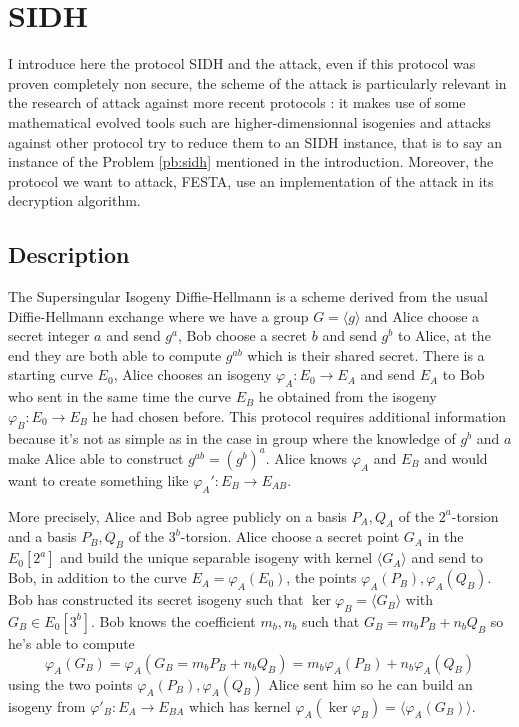 \documentclass[12pt,a4paper]{article}
\begin{document}
		\section{SIDH}


		I introduce here the protocol SIDH and the attack, even if this protocol was proven completely non
		secure, the scheme of the attack is particularly relevant in the research of attack against more
		recent protocols : it makes use of some mathematical evolved tools such are higher-dimensionnal
		isogenies and attacks against other protocol try to reduce them to an SIDH instance, that is to say 
		an instance of the Problem \ref{pb:sidh} mentioned in the introduction.
		Moreover, the protocol we want to attack, FESTA, use an implementation of the attack in its
		decryption algorithm.  

		\subsection{Description}
	The Supersingular Isogeny Diffie-Hellmann is a scheme derived from the usual
	Diffie-Hellmann exchange where we have a group $G= \langle g\rangle$ and Alice choose a
	secret integer $a$ and send $g^a$, Bob choose a secret $b$ and send $g^b$ to Alice,
	at the end they are both able to compute $g^{ab}$ which is their shared secret.
	There is a starting curve $E_0$, Alice chooses an isogeny $\varphi_A:E_0\to E_A$
	and send $E_A$ to Bob who sent in the same time the curve $E_B$ he obtained
	from the isogeny $\varphi_B:E_0\to E_B$ he had chosen before.
	This protocol requires additional information because it's not as simple as in the
	case in group where the knowledge of $g^b$ and $a$ make Alice able to construct
	$g^{ab}=(g^b)^a$.
	Alice knows $\varphi_A$ and  $E_B$ and would want to create something like
	$\varphi_A':E_B\to E_{AB}$.

	More precisely, Alice and Bob agree publicly on a basis $P_A,Q_A$ of the  $2^{a}$-torsion
	and a basis $P_B,Q_B$ of the $3^{b}$-torsion. Alice choose a secret point $G_A$ in the $E_0[2^{a}]$
	and build the unique separable isogeny with kernel $\langle G_A \rangle$ and send to Bob, in
	addition to the curve $E_A=\varphi_A(E_0)$, the points $\varphi_A(P_B),\varphi_A(Q_B)$.
	Bob has constructed its secret isogeny such that $\ker\varphi_B=\langle G_B\rangle$ with
	$G_B\in E_0[3^b]$. Bob knows the coefficient $m_b,n_b$ such that $G_B=m_bP_B+n_bQ_B$ so he's
	able to compute  $$\varphi_A(G_B)=\varphi_A(G_B=m_bP_B+n_bQ_B)=m_b\varphi_A(P_B)+n_b\varphi_A(Q_B)$$
	using the two points $\varphi_A(P_B),\varphi_A(Q_B)$ Alice sent him so he can build an isogeny
	from $\varphi'_B:E_A\to E_{BA}$ which has kernel $\varphi_A(\ker\varphi_B) = \langle
	\varphi_A(G_B)\rangle$.
\end{document}
